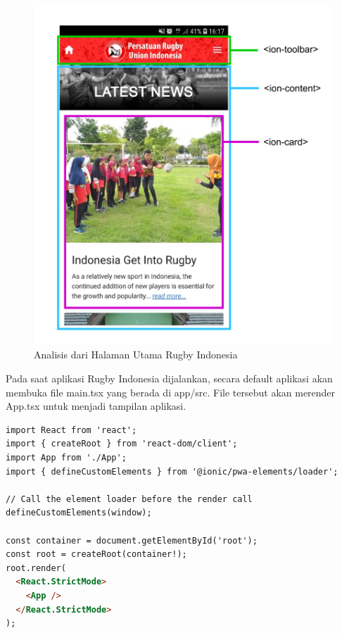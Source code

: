 \begin{figure} [H]
    \centering
    \includegraphics[scale=0.1]{Gambar/latest_news-analytics.png}
    \caption{Analisis dari Halaman Utama Rugby Indonesia}
    \label{fig:homepage-analytics}
\end{figure}

Pada saat aplikasi Rugby Indonesia dijalankan, secara default aplikasi akan membuka file main.tsx yang berada di app/src. File tersebut akan merender App.tsx untuk menjadi tampilan aplikasi. 

\begin{lstlisting}[language=HTML, caption=Kode dari main.tsx, label=kode:main-tsx]
import React from 'react';
import { createRoot } from 'react-dom/client';
import App from './App';
import { defineCustomElements } from '@ionic/pwa-elements/loader';

// Call the element loader before the render call
defineCustomElements(window);

const container = document.getElementById('root');
const root = createRoot(container!);
root.render(
  <React.StrictMode>
    <App />
  </React.StrictMode>
);
\end{lstlisting}

